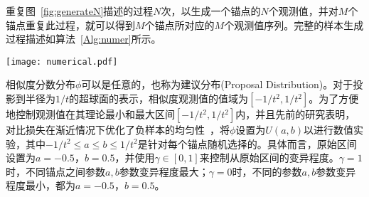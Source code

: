 重复图~\ref{fig:generateN}描述的过程$N$次，以生成一个锚点的$N$个观测值，并对$M$个锚点重复此过程，就可以得到$M$个锚点所对应的$M$个观测值序列。完整的样本生成过程描述如算法~\ref{Alg:numer}所示。
\begin{figure*}[!]
	\centering
	\texttt{[image: numerical.pdf]}
	\caption{未标注样本相似度分数生成过程示意图}
	\label{fig:generateN}
\end{figure*}
\begin{algorithm}[!]
	\small
	\SetAlgoLined
	\caption{未标注样本相似度分数观测值生成过程}\label{Alg:numer}
	\BlankLine
\end{algorithm}

相似度分数分布$\phi$可以是任意的，也称为建议分布(Proposal Distribution)。对于投影到半径为$1/t$的超球面的表示，相似度观测值的值域为$[-1/t^2, 1/t^2]$。为了方便地控制观测值在其理论最小和最大区间$[-1/t^2,1/t^2]$内，并且先前的研究表明，对比损失在渐近情况下优化了负样本的均匀性~\cite{Wang:2020:ICML}，将$\phi$设置为$U(a,b)$以进行数值实验，其中$-1/t^2\leq a \leq b \leq 1/t^2$是针对每个锚点随机选择的。具体而言，原始区间设置为$a=-0.5$，$b=0.5$，并使用$\gamma \in [0,1]$来控制从原始区间的变异程度。$\gamma=1$时，不同锚点之间参数$a,b$参数变异程度最大；$\gamma=0$时，不同的参数$a,b$参数变异程度最小，都为$a=-0.5$，$b=0.5$。

